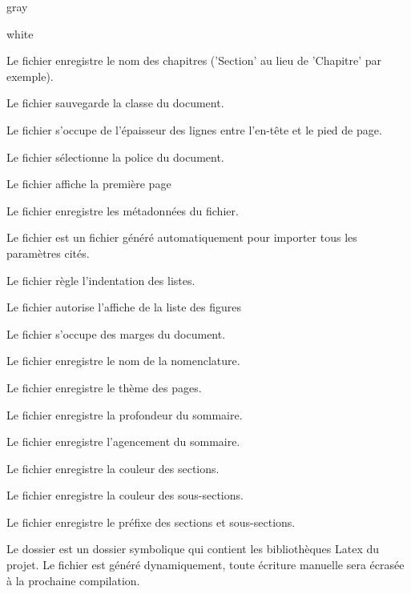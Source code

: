 \begin{items}{gray}{\faFolder}
\begin{items}{white}{}
        \item Le fichier  enregistre le nom des chapitres ('Section' au lieu de 'Chapitre' par exemple).
        \item Le fichier  sauvegarde la classe du document.
        \item Le fichier  s'occupe de l'épaisseur des lignes entre l'en-tête et le pied de page.
        \item Le fichier  sélectionne la police du document.
        \item Le fichier  affiche la première page
        \item Le fichier  enregistre les métadonnées du fichier.
        \item Le fichier  est un fichier généré automatiquement pour importer tous les paramètres cités.
        \item Le fichier  règle l'indentation des listes.
        \item Le fichier  autorise l'affiche de la liste des figures
        \item Le fichier  s'occupe des marges du document.
        \item Le fichier  enregistre le nom de la nomenclature.
        \item Le fichier  enregistre le thème des pages.
        \item Le fichier  enregistre la profondeur du sommaire.
        \item Le fichier  enregistre l'agencement du sommaire.
        \item Le fichier  enregistre la couleur des sections.
        \item Le fichier  enregistre la couleur des sous-sections.
        \item Le fichier  enregistre le préfixe des sections et sous-sections.

    \end{items}
    \item Le dossier  est un dossier symbolique qui contient les bibliothèques Latex du projet. Le fichier  est généré 
    dynamiquement, toute écriture manuelle sera écrasée à la prochaine compilation.


\end{items}
